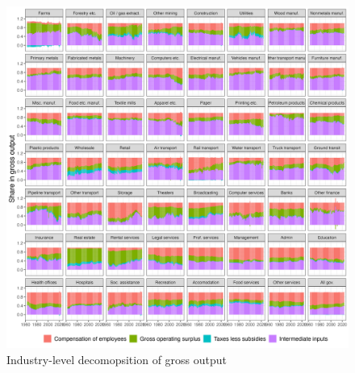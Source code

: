 \documentclass[12pt]{article}
\begin{document}
\begin{figure}\caption{Industry-level decomopsition of gross output}\label{ind_godecomp}
    \includegraphics[width=\textwidth]{../figures/exploration/IO-matrices/GO = wL + GOS + T + M_with_imputation.png}
\end{figure}
\end{document}
